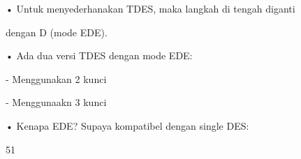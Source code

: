 \documentclass{article}
\begin{document}

• Untuk menyederhanakan TDES, maka langkah di tengah diganti 

dengan D (mode EDE).

• Ada dua versi TDES dengan mode EDE: 

 - Menggunakan 2 kunci

 - Menggunaakn 3 kunci

• Kenapa EDE? Supaya kompatibel dengan single DES:

51
\end{document}
